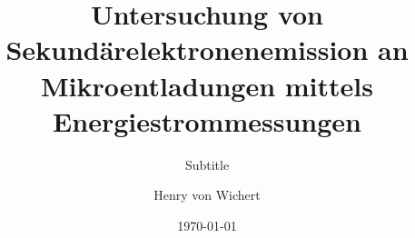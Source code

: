 \documentclass[fontsize=12pt,headsepline, twoside,cleardoublepage=empty,paper=a4,listof=totoc,bibliography=totoc]{scrbook}
\author{Henry von Wichert}
\date{\today}
\title{Untersuchung von Sekundärelektronenemission an Mikroentladungen mittels Energiestrommessungen}
\subtitle{Subtitle}
\begin{document}
\makeatletter

{}




\makeatother



	\tableofcontents
    \cleardoublepage













\begin{appendix}


\end{appendix}

\printbibliography
\clearpage


\end{document}
